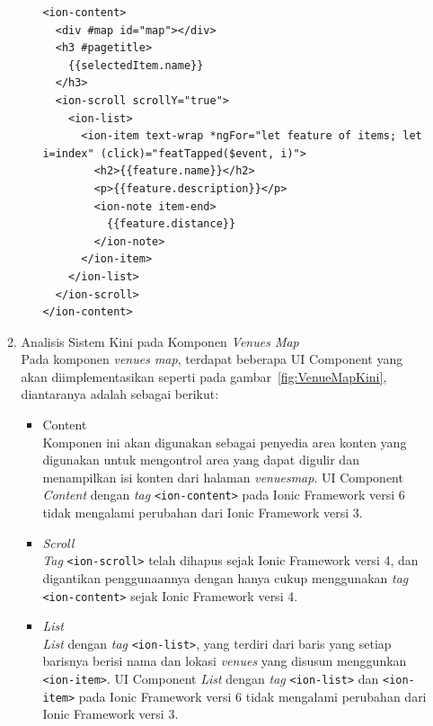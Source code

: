 \begin{enumerate}
\begin{enumerate}
\begin{itemize}
\begin{lstlisting}[label={lst:contentVenuesMap}, caption=\textit{Content} pada venues\textunderscore map.html]
<ion-content>
  <div #map id="map"></div>
  <h3 #pagetitle>
    {{selectedItem.name}}
  </h3>
  <ion-scroll scrollY="true">
    <ion-list>
      <ion-item text-wrap *ngFor="let feature of items; let i=index" (click)="featTapped($event, i)">
        <h2>{{feature.name}}</h2>
        <p>{{feature.description}}</p>
        <ion-note item-end>
          {{feature.distance}}
        </ion-note>
      </ion-item>
    </ion-list>
  </ion-scroll>
</ion-content>
\end{lstlisting}

	\end{itemize}
		\item Analisis Sistem Kini pada Komponen \textit{Venues Map} \\
		Pada komponen \textit{venues map}, terdapat beberapa UI Component yang akan diimplementasikan seperti pada gambar~\ref{fig:VenueMapKini}, diantaranya adalah sebagai berikut:
	\begin{itemize}
			\item Content \\
		Komponen ini akan digunakan sebagai penyedia area konten yang digunakan untuk mengontrol area yang dapat digulir dan menampilkan isi konten dari halaman \textit{venues\textunderscore map}. UI Component \textit{Content} dengan \textit{tag} \texttt{<ion-content>} pada Ionic Framework versi 6 tidak mengalami perubahan dari Ionic Framework versi 3.

			\item \textit{Scroll} \\
			\textit{Tag} \texttt{<ion-scroll>} telah dihapus sejak Ionic Framework versi 4, dan digantikan penggunaannya dengan hanya cukup menggunakan \textit{tag} \texttt{<ion-content>} sejak Ionic Framework versi 4.
		
			\item \textit{List} \\
		\textit{List} dengan \textit{tag} \texttt{<ion-list>}, yang terdiri dari baris yang setiap barisnya berisi nama dan lokasi \textit{venues} yang disusun menggunkan \texttt{<ion-item>}. UI Component \textit{List} dengan \textit{tag} \texttt{<ion-list>} dan \texttt{<ion-item>} pada Ionic Framework versi 6 tidak mengalami perubahan dari Ionic Framework versi 3.
		\end{itemize}
	\end{enumerate}
	
\end{enumerate}
